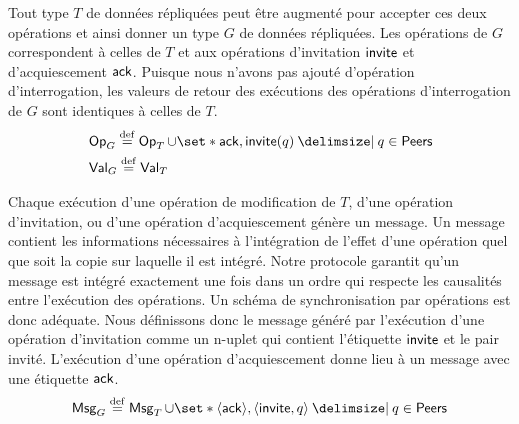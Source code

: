 
Tout type $T$ de données répliquées peut être augmenté pour accepter ces deux opérations et ainsi donner un type $G$ de données répliquées.
Les opérations de $G$ correspondent à celles de $T$ et aux opérations d'invitation $\operatorname{\mathsf{invite}}$ et d'acquiescement $\operatorname{\mathsf{ack}}$.
Puisque nous n'avons pas ajouté d'opération d'interrogation, les valeurs de retour des exécutions des opérations d'interrogation de $G$ sont identiques à celles de $T$.
%
\begin{align}
    &\trm{Op}_G \defeq \trm{Op}_T \cup \set*{\trm{ack}, \trm{invite}(q) \given q \in \trm{Peers}}\\
    &\trm{Val}_G \defeq \trm{Val}_T
\end{align}

Chaque exécution d'une opération de modification de $T$, d'une opération d'invitation, ou d'une opération d'acquiescement génère un message.
Un message contient les informations nécessaires à l'intégration de l'effet d'une opération quel que soit la copie sur laquelle il est intégré.
Notre protocole garantit qu'un message est intégré exactement une fois dans un ordre qui respecte les causalités entre l'exécution des opérations.
Un schéma de synchronisation par opérations est donc adéquate.
Nous définissons donc le message généré par l'exécution d'une opération d'invitation comme un n-uplet qui contient l'étiquette $\operatorname{\mathsf{invite}}$ et le pair invité.
L'exécution d'une opération d'acquiescement donne lieu à un message avec une étiquette $\operatorname{\mathsf{ack}}$.
%
\begin{equation}
    \trm{Msg}_G \defeq \trm{Msg}_T \cup \set*{\tuple*{\trm{ack}}, \tuple*{\trm{invite}, q} \given q \in \trm{Peers}}
\end{equation}

